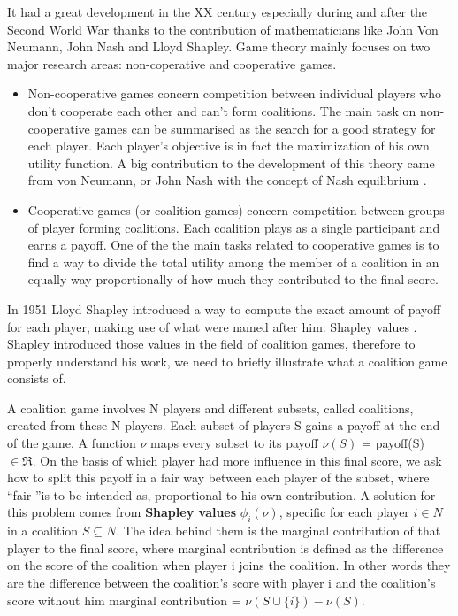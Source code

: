 \documentclass[11pt]{report}
\begin{document}
It had a great development in the XX century especially during and after the Second World War thanks to the contribution of mathematicians like John Von Neumann, John Nash and Lloyd Shapley.
Game theory mainly focuses on two major research areas: non-coperative and cooperative games.
\begin{itemize}
\item Non-cooperative games concern competition between individual players who don't cooperate each other and can't form coalitions. The main task on non-cooperative games can be summarised as the search for a good strategy for each player. Each player's objective is in fact the maximization of his own utility function.
A big contribution to the development of this theory came from von Neumann, or John Nash with the concept of Nash equilibrium \cite{nash-1950}.

\item Cooperative games (or coalition games) concern competition between groups of player forming coalitions.
Each coalition plays as a single participant and earns a payoff.
One of the the main tasks related to cooperative games is to find a way to divide the total utility among the member of a coalition in an equally way proportionally of how much they contributed to the final score.
\end{itemize}
In 1951 Lloyd Shapley introduced a way to compute the exact amount of payoff for each player, making use of what were named after him: Shapley values \cite{shapley1951-I}\cite{shapley1953}.
Shapley introduced those values in the field of coalition games, therefore to properly understand his work, we need to briefly illustrate what a coalition game consists of.

A coalition game involves N players and different subsets, called coalitions, created from these N players.
Each subset of players S gains a payoff at the end of the game.
A function $\nu$ maps every subset to its payoff $\nu(S)$ = payoff(S) $\in \Re$.
On the basis of which player had more influence in this final score, we ask how to split this payoff in a fair way between each player of the subset, where \textquotedblleft fair \textquotedblright is to be intended as, proportional to his own contribution.
A solution for this problem comes from \textbf{Shapley values} $\phi_i(\nu)$, specific for each player $i\in N$  in a coalition $S \subseteq N$.
The idea behind them is the marginal contribution of that player to the final score, where marginal contribution is defined as the difference on the score of the coalition when player i joins the coalition.
In other words they are the difference between the coalition's score with player i and the coalition's score without him $\text{marginal contribution = }\nu (S \cup \{ i \}) - \nu(S)$. \cite{algaba-2021}
\end{document}
